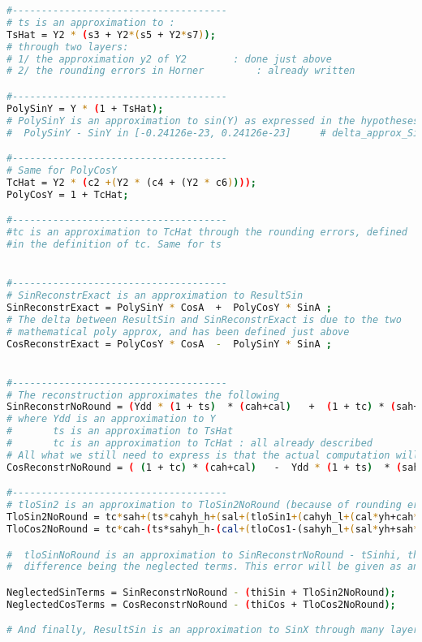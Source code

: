\begin{lstlisting}[caption={Gappa input to compute the error of DoSineNotZero},
  language={sh}, numbers=none]
#-------------------------------------
# ts is an approximation to :
TsHat = Y2 * (s3 + Y2*(s5 + Y2*s7));
# through two layers: 
# 1/ the approximation y2 of Y2        : done just above
# 2/ the rounding errors in Horner         : already written

#-------------------------------------
PolySinY = Y * (1 + TsHat);
# PolySinY is an approximation to sin(Y) as expressed in the hypotheses below :
#  PolySinY - SinY in [-0.24126e-23, 0.24126e-23]     # delta_approx_Sin_Case3

#-------------------------------------
# Same for PolyCosY
TcHat = Y2 * (c2 +(Y2 * (c4 + (Y2 * c6))));
PolyCosY = 1 + TcHat;

#------------------------------------- 
#tc is an approximation to TcHat through the rounding errors, defined
#in the definition of tc. Same for ts


#-------------------------------------
# SinReconstrExact is an approximation to ResultSin 
SinReconstrExact = PolySinY * CosA  +  PolyCosY * SinA ;
# The delta between ResultSin and SinReconstrExact is due to the two
# mathematical poly approx, and has been defined just above
CosReconstrExact = PolyCosY * CosA  -  PolySinY * SinA ;


#-------------------------------------
# The reconstruction approximates the following
SinReconstrNoRound = (Ydd * (1 + ts)  * (cah+cal)   +  (1 + tc) * (sah+sal) );
# where Ydd is an approximation to Y
#       ts is an approximation to TsHat
#       tc is an approximation to TcHat : all already described
# All what we still need to express is that the actual computation will neglect some terms
CosReconstrNoRound = ( (1 + tc) * (cah+cal)   -  Ydd * (1 + ts)  * (sah+sal) );

#-------------------------------------
# tloSin2 is an approximation to TloSin2NoRound (because of rounding error in the operations, already described) 
TloSin2NoRound = tc*sah+(ts*cahyh_h+(sal+(tloSin1+(cahyh_l+(cal*yh+cah*yl))))) ;
TloCos2NoRound = tc*cah-(ts*sahyh_h-(cal+(tloCos1-(sahyh_l+(sal*yh+sah*yl)))));

#  tloSinNoRound is an approximation to SinReconstrNoRound - tSinhi, the
#  difference being the neglected terms. This error will be given as an hint

NeglectedSinTerms = SinReconstrNoRound - (thiSin + TloSin2NoRound);
NeglectedCosTerms = CosReconstrNoRound - (thiCos + TloCos2NoRound);

# And finally, ResultSin is an approximation to SinX through many layers which are given in the hints.


\end{lstlisting}
